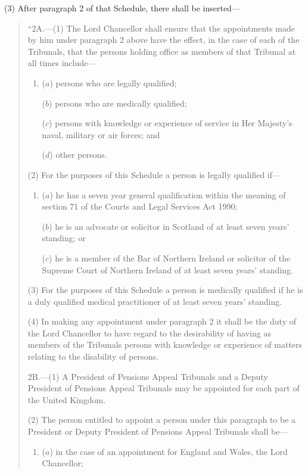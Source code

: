 \documentclass[12pt,a4paper]{article}
\begin{document}
(3) After paragraph 2 of that Schedule, there shall be inserted—
\begin{quotation}
“2A.---(1) The Lord Chancellor shall ensure that the appointments made by him under paragraph 2 above have the effect, in the case of each of the Tribunals, that the persons holding office as members of that Tribunal at all times include—
\begin{enumerate}\item[]
($a$) persons who are legally qualified;

($b$) persons who are medically qualified;

($c$) persons with knowledge or experience of service in Her Majesty’s naval, military or air forces; and

($d$) other persons.
\end{enumerate}

(2) For the purposes of this Schedule a person is legally qualified if—
\begin{enumerate}\item[]
($a$) he has a seven year general qualification within the meaning of section 71 of the Courts and Legal Services Act 1990;

($b$) he is an advocate or solicitor in Scotland of at least seven years' standing; or

($c$) he is a member of the Bar of Northern Ireland or solicitor of the Supreme Court of Northern Ireland of at least seven years' standing.
\end{enumerate}

(3) For the purposes of this Schedule a person is medically qualified if he is a duly qualified medical practitioner of at least seven years' standing.

(4) In making any appointment under paragraph 2 it shall be the duty of the Lord Chancellor to have regard to the desirability of having as members of the Tribunals persons with knowledge or experience of matters relating to the disability of persons.

\medskip

2B.---(1) A President of Pensions Appeal Tribunals and a Deputy President of Pensions Appeal Tribunals may be appointed for each part of the United Kingdom.

(2) The person entitled to appoint a person under this paragraph to be a President or Deputy President of Pensions Appeal Tribunals shall be—
\begin{enumerate}\item[]
($a$) in the case of an appointment for England and Wales, the Lord Chancellor;


\end{enumerate}
\end{quotation}
\end{document}
